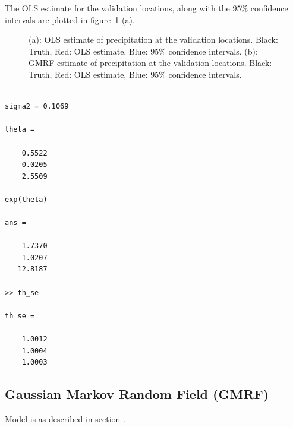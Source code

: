 \documentclass[a4paper,10pt]{article}
\begin{document}
The OLS estimate for the validation locations, along with the 95\% confidence intervals are plotted in figure~\ref{fig:valid} (a).
\begin{figure}[ht]
\centering
  \qquad
  \caption{(a): OLS estimate of precipitation at the validation locations. Black: Truth, Red: OLS estimate, Blue: 95\% confidence intervals. (b): GMRF estimate of precipitation at the validation locations. Black: Truth, Red: OLS estimate, Blue: 95\% confidence intervals.}
\label{fig:valid}
\end{figure}

\begin{verbatim}

sigma2 = 0.1069

theta =

    0.5522
    0.0205
    2.5509

exp(theta)

ans =

    1.7370
    1.0207
   12.8187
   
>> th_se

th_se =

    1.0012
    1.0004
    1.0003
\end{verbatim}

\subsection{Gaussian Markov Random Field (GMRF)}
Model is as described in section .
\end{document}
